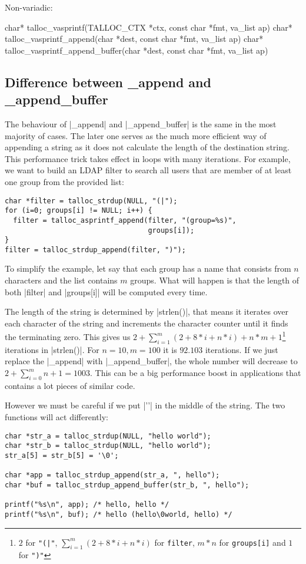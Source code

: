 Non-variadic:
\begin{funcproto}
char* talloc_vasprintf(TALLOC_CTX *ctx, const char *fmt,
                       va_list ap)
char* talloc_vasprintf_append(char *dest, const char *fmt,
                              va_list ap)
char* talloc_vasprintf_append_buffer(char *dest, const char
                                     *fmt, va_list ap)
\end{funcproto}

\subsection{Difference between _append and _append_buffer}

The behaviour of |_append| and |_append_buffer| is the same in the most majority
of cases. The later one serves as the much more efficient way of appending a
string as it does not calculate the length of the destination string. This
performance trick takes effect in loops with many iterations. For example, we
want to build an LDAP filter to search all users that are member of at least one
group from the provided list:

\begin{lstlisting}[caption={Appending a string}]
char *filter = talloc_strdup(NULL, "(|");
for (i=0; groups[i] != NULL; i++) {
  filter = talloc_asprintf_append(filter, "(group=%s)",
                                  groups[i]);
}
filter = talloc_strdup_append(filter, ")");
\end{lstlisting}

To simplify the example, let say that each group has a name that consists from
$n$ characters and the list contains $m$ groups. What will happen is that
the length of both |filter| and |groups[i]| will be computed every time.

The length of the string is determined by |strlen()|, that means it iterates
over each character of the string and increments the character counter until it
finds the terminating zero. This gives us $2 + \sum_{i=1}^m (2 + 8*i + n*i) +
n*m + 1$\footnote{$2$ for \lstinline{"(|"}, $\sum_{i=1}^m (2 + 8*i + n*i)$ for
\lstinline{filter}, $m*n$ for \lstinline{groups[i]} and $1$ for \lstinline{")"}}
iterations in |strlen()|. For $n = 10, m = 100$ it is $92.103$ iterations. If
we just replace the |_append| with |_append_buffer|, the whole number will
decrease to $2 + \sum_{i=0}^m n + 1 = 1003$. This can be a big performance
boost in applications that contains a lot pieces of similar code.

However we must be careful if we put |'\0'| in the middle of the string. The two
functions will act differently:

\begin{lstlisting}[caption={Zero in the middle of a string}]
char *str_a = talloc_strdup(NULL, "hello world");
char *str_b = talloc_strdup(NULL, "hello world");
str_a[5] = str_b[5] = '\0';

char *app = talloc_strdup_append(str_a, ", hello");
char *buf = talloc_strdup_append_buffer(str_b, ", hello");

printf("%s\n", app); /* hello, hello */
printf("%s\n", buf); /* hello (hello\0world, hello) */
\end{lstlisting}
